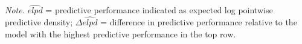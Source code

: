 \documentclass[
  english,
  man,floatsintext]{apa7}
\begin{document}
\begin{appendix}
\begin{table}[tbp]
\begin{center}
\begin{threeparttable}
\begin{tablenotes}[para]
\normalsize{\textit{Note.} $\widehat{elpd}$ = predictive performance indicated as expected log pointwise predictive density; $\Delta\widehat{elpd}$ = difference in predictive performance relative to the model with the highest predictive performance in the top row.}
\end{tablenotes}

\end{threeparttable}
\end{center}

\end{table}
\end{appendix}
\end{document}
